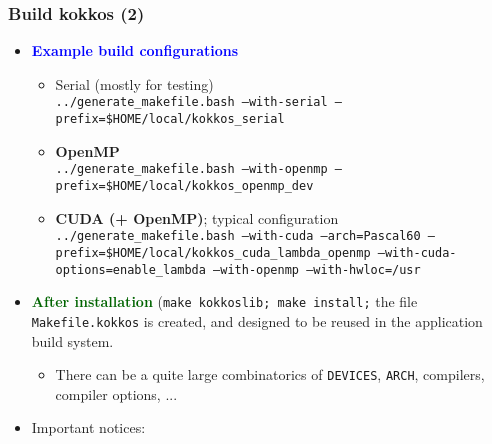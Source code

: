 \begin{frame}
  \frametitle{Build kokkos (2)}

  \begin{itemize}
  \item \textcolor{blue}{\textbf{Example build configurations}}
    \begin{itemize}
    \item Serial (mostly for testing)\\
      \texttt{../generate\_makefile.bash --with-serial --prefix=\$HOME/local/kokkos\_serial}
    \item \textbf{OpenMP}\\
      \texttt{../generate\_makefile.bash --with-openmp --prefix=\$HOME/local/kokkos\_openmp\_dev}
    \item \textbf{CUDA (+ OpenMP)}; typical configuration\\
      \texttt{../generate\_makefile.bash --with-cuda --arch=Pascal60 --prefix=\$HOME/local/kokkos\_cuda\_lambda\_openmp --with-cuda-options=enable\_lambda --with-openmp --with-hwloc=/usr}
    \end{itemize}
  \item \textcolor{darkgreen}{\textbf{After installation}} (\texttt{make kokkoslib; make install;} the file \texttt{Makefile.kokkos} is created, and designed to be reused in the application build system.
    \begin{itemize}
    \item There can be a quite large combinatorics of \texttt{DEVICES}, \texttt{ARCH}, compilers, compiler options, ...
    \end{itemize}
  \item Important notices:
  \end{itemize}
  
\end{frame}

